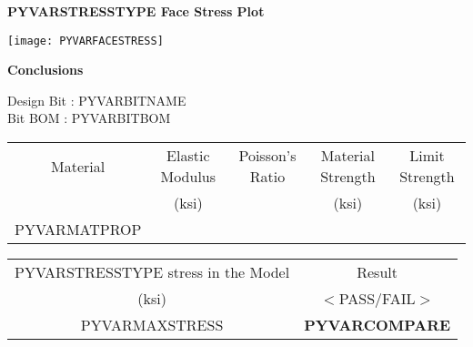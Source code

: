 \documentclass[20pt]{extreport}
\begin{document}
\newpage   %
\flushleft
{\LARGE\color{Blue}\textbf {PYVARSTRESSTYPE  Face Stress Plot}}
\noindent {\color{OliveGreen} \rule{\linewidth}{0.125in}}
\vspace{0.1in}
\begin{center}
\texttt{[image: PYVARFACESTRESS]}
\end{center}


\newpage   %
\flushleft
{\LARGE\color{Blue}\textbf {Conclusions}}
\noindent {\color{OliveGreen} \rule{\linewidth}{0.125in}}
\justify
\vspace{10pt}

\large Design Bit : PYVARBITNAME\\
\large Bit BOM : PYVARBITBOM\\
\vspace{10pt}

\begin{flushleft}
 \begin{tabular}{||c|c|c|c|c||} 
 \hline
 \small Material & \small Elastic Modulus & \small Poisson's Ratio & \small Material Strength & \small Limit Strength \\ [0.5ex]
 \small  & \small (ksi) & \small  & \small (ksi)  & \small (ksi)\\ [0.5ex]  
 \hline\hline
 \newline
PYVARMATPROP
 \hline
 \end{tabular}
 \end{flushleft}

 \vspace{10pt}
 \begin{flushleft}
 \begin{tabular}{||c|c||} 
 \hline
 \small PYVARSTRESSTYPE stress in the Model & \small Result \\ [0.5ex]
 \small  (ksi) & \small $<$PASS/FAIL$>$ \\ [0.5ex]  
 \hline\hline
 \newline
\small  PYVARMAXSTRESS & \textbf{PYVARCOMPARE} \\ [0.5ex] 
 \hline
 \end{tabular}
 \end{flushleft}
\end{document}
